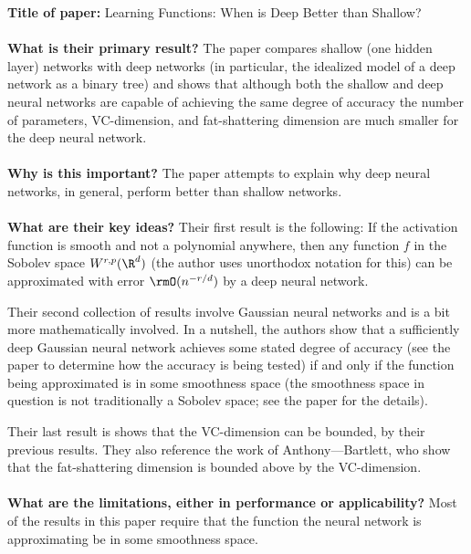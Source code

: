 \noindent\textbf{\large Title of paper:} Learning Functions: When is Deep
Better than Shallow?
\\\\
\textbf{\large What is their primary result?} The paper compares shallow (one
hidden layer) networks with deep networks (in particular, the idealized model of
a deep network as a binary tree) and shows that although both the shallow and
deep neural networks are capable of achieving the same degree of accuracy the
number of parameters, VC-dimension, and fat-shattering dimension are much
smaller for the deep neural network.
\\\\
\textbf{\large Why is this important?} The paper attempts to explain why deep
neural networks, in general, perform better than shallow networks.
\\\\
\textbf{\large What are their key ideas?} Their first result is the following:
If the activation function is smooth and not a polynomial anywhere, then any
function $f$ in the Sobolev space $W^{r,p}(\R^d)$ (the author uses unorthodox
notation for this) can be approximated with error $\rmO(n^{-r/d})$ by a deep
neural network.

Their second collection of results involve Gaussian neural networks and is a bit
more mathematically involved. In a nutshell, the authors show that a
sufficiently deep Gaussian neural network achieves some stated degree of
accuracy (see the paper to determine how the accuracy is being tested) if and
only if the function being approximated is in some smoothness space (the
smoothness space in question is not traditionally a Sobolev space; see the paper
for the details).

Their last result is shows that the VC-dimension can be bounded, by their
previous results. They also reference the work of Anthony---Bartlett, who show
that the fat-shattering dimension is bounded above by the VC-dimension.
\\\\
\textbf{\large What are the limitations, either in performance or
  applicability?} Most of the results in this paper require that the function
the neural network is approximating be in some smoothness space.
\\\\

